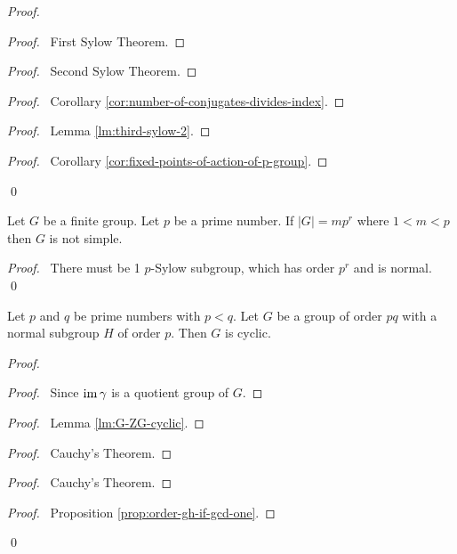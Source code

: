 \begin{proof}
\pf
{}
\begin{proof}
	\pf\ First Sylow Theorem.
\end{proof}
\begin{proof}
	\pf\ Second Sylow Theorem.
\end{proof}
\begin{proof}
	\pf\ Corollary \ref{cor:number-of-conjugates-divides-index}.
\end{proof}
\begin{proof}
	\pf\ Lemma \ref{lm:third-sylow-2}.
\end{proof}
\begin{proof}
	\pf\ Corollary \ref{cor:fixed-points-of-action-of-p-group}.
\end{proof}
\qed
\end{proof}

\begin{cor}
\label{cor:mpr-not-simple}
Let $G$ be a finite group. Let $p$ be a prime number. If $|G| = mp^r$ where $1 < m < p$ then $G$ is not simple.
\end{cor}

\begin{proof}
\pf\ There must be 1 $p$-Sylow subgroup, which has order $p^r$ and is normal.
\qed
\end{proof}

\begin{prop}
Let $p$ and $q$ be prime numbers with $p < q$. Let $G$ be a group of order $pq$ with a normal subgroup $H$ of order $p$. Then $G$ is cyclic.
\end{prop}

\begin{proof}
\pf
{}
\begin{proof}
	\pf\ Since $\operatorname{im} \gamma$ is a quotient group of $G$.
\end{proof}
\begin{proof}
	\pf\ Lemma \ref{lm:G-ZG-cyclic}.
\end{proof}
\begin{proof}
	\pf\ Cauchy's Theorem.
\end{proof}
\begin{proof}
	\pf\ Cauchy's Theorem.
\end{proof}
\begin{proof}
	\pf\ Proposition \ref{prop:order-gh-if-gcd-one}.
\end{proof}
\qed
\end{proof}

